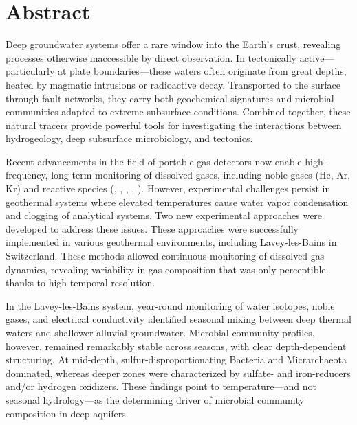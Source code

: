 \begingroup
\let\clearpage\relax
\let\cleardoublepage\relax
\let\cleardoublepage\relax

\chapter*{Abstract}

Deep groundwater systems offer a rare window into the Earth's crust, revealing processes otherwise inaccessible by direct observation.
In tectonically active---particularly at plate boundaries---these waters often originate from great depths, heated by magmatic intrusions or radioactive decay.
Transported to the surface through fault networks, they carry both geochemical signatures and microbial communities adapted to extreme subsurface conditions.
Combined together, these natural tracers provide powerful tools for investigating the interactions between hydrogeology, deep subsurface microbiology, and tectonics.

Recent advancements in the field of portable gas detectors now enable high-frequency, long-term monitoring of dissolved gases, including noble gases (He, Ar, Kr) and reactive species (, , , , ).
However, experimental challenges persist in geothermal systems where elevated temperatures cause water vapor condensation and clogging of analytical systems.
Two new experimental approaches were developed to address these issues.
These approaches were successfully implemented in various geothermal environments, including Lavey-les-Bains in Switzerland.
These methods allowed continuous monitoring of dissolved gas dynamics, revealing variability in gas composition that was only perceptible thanks to high temporal resolution.

In the Lavey-les-Bains system, year-round monitoring of water isotopes, noble gases, and electrical conductivity identified seasonal mixing between deep thermal waters and shallower alluvial groundwater.
Microbial community profiles, however, remained remarkably stable across seasons, with clear depth-dependent structuring.
At mid-depth, sulfur-disproportionating Bacteria and Micrarchaeota dominated, whereas deeper zones were characterized by sulfate- and iron-reducers and/or hydrogen oxidizers.
These findings point to temperature---and not seasonal hydrology---as the determining driver of microbial community composition in deep aquifers.

